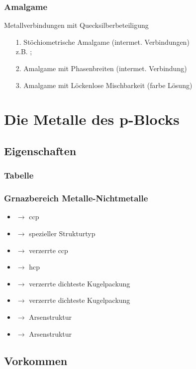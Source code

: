 \documentclass{article}
\begin{document}
\subsubsection{Amalgame}
Metallverbindungen mit Quecksilberbeteiligung
\begin{itemize}
    \item[1.] Stöchiometrische Amalgame (intermet. Verbindungen)\\z.B. ; 
    \item[2.] Amalgame mit Phasenbreiten (intermet. Verbindung)\\
    \item[3.] Amalgame mit Löckenlose Mischbarkeit (farbe Lösung)\\
\end{itemize}

\section{Die Metalle des p-Blocks}
\subsection{Eigenschaften}
\subsubsection{Tabelle}
\subsubsection{Grnazbereich Metalle-Nichtmetalle}
\begin{itemize}
    \item {} $\rightarrow$ ccp
    \item {} $\rightarrow$ spezieller Strukturtyp
    \item {} $\rightarrow$ verzerrte ccp
    \item {} $\rightarrow$ hcp
    \item {} $\rightarrow$ verzerrte dichteste Kugelpackung
    \item {} $\rightarrow$ verzerrte dichteste Kugelpackung
    \item {} $\rightarrow$ Arsenstruktur
    \item {} $\rightarrow$ Arsenstruktur
\end{itemize}
\subsection{Vorkommen}
\end{document}

